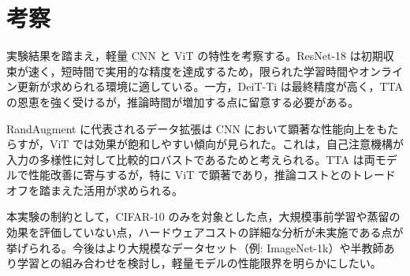 \section{考察}\label{sec:discussion}
実験結果を踏まえ，軽量 CNN と ViT の特性を考察する。ResNet-18 は初期収束が速く，短時間で実用的な精度を達成するため，限られた学習時間やオンライン更新が求められる環境に適している。一方，DeiT-Ti は最終精度が高く，TTA の恩恵を強く受けるが，推論時間が増加する点に留意する必要がある。

RandAugment に代表されるデータ拡張は CNN において顕著な性能向上をもたらすが，ViT では効果が飽和しやすい傾向が見られた。これは，自己注意機構が入力の多様性に対して比較的ロバストであるためと考えられる。TTA は両モデルで性能改善に寄与するが，特に ViT で顕著であり，推論コストとのトレードオフを踏まえた活用が求められる。

本実験の制約として，CIFAR-10 のみを対象とした点，大規模事前学習や蒸留の効果を評価していない点，ハードウェアコストの詳細な分析が未実施である点が挙げられる。今後はより大規模なデータセット（例: ImageNet-1k）や半教師あり学習との組み合わせを検討し，軽量モデルの性能限界を明らかにしたい。

